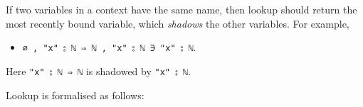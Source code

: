 If two variables in a context have the same name, then lookup should
return the most recently bound variable, which \emph{shadows} the other
variables. For example,

\begin{itemize}
\tightlist
\item
  \texttt{∅\ ,\ "x"\ ⦂\ \textasciigrave{}ℕ\ ⇒\ \textasciigrave{}ℕ\ ,\ "x"\ ⦂\ \textasciigrave{}ℕ\ ∋\ "x"\ ⦂\ \textasciigrave{}ℕ}.
\end{itemize}

Here \texttt{"x"\ ⦂\ \textasciigrave{}ℕ\ ⇒\ \textasciigrave{}ℕ} is
shadowed by \texttt{"x"\ ⦂\ \textasciigrave{}ℕ}.

Lookup is formalised as follows:

\begin{fence}
\begin{code}%
\>[0]%
\>[7]%
\>[10]\<%
\\
%
\\[\AgdaEmptyExtraSkip]%
\>[0]\AgdaSpace{}%
\AgdaSpace{}%
\AgdaSymbol{:}\AgdaSpace{}%
\AgdaSpace{}%
\AgdaSpace{}%
\AgdaSpace{}%
\AgdaSpace{}%
\AgdaSpace{}%
\AgdaSpace{}%
\AgdaSpace{}%
\<%
\\
%
\\[\AgdaEmptyExtraSkip]%
\>[0][@{}l@{\AgdaIndent{0}}]%
\>[2]%
\>[1539I]\AgdaSymbol{:}%
\>[1540I]\AgdaSpace{}%
\AgdaSymbol{\{}\AgdaSpace{}%
\AgdaSpace{}%
\AgdaSymbol{\}}\<%
\\
\>[.][@{}l@{}]\<[1540I]%
\>[6]\AgdaComment{------------------}\<%
\\
\>[.][@{}l@{}]\<[1539I]%
\>[4]\AgdaSpace{}%
\AgdaSpace{}%
\AgdaOperator{\AgdaInductiveConstructor{,}}\AgdaSpace{}%
\AgdaSpace{}%
\AgdaSpace{}%
\AgdaSpace{}%
\AgdaSpace{}%
\AgdaSpace{}%
\AgdaSpace{}%
\<%
\\
%
\\[\AgdaEmptyExtraSkip]%
%
\>[2]%
\>[1553I]\AgdaSymbol{:}\AgdaSpace{}%

\end{code}
\end{fence}
